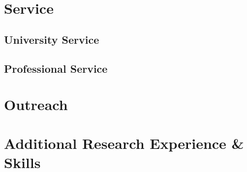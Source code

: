 

\section*{Service}
\subsection*{University Service}


\subsection*{Professional Service}


\section*{Outreach}


\section*{Additional Research Experience \& Skills}


% 

% 


